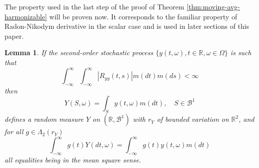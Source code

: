 \documentclass{article}
\newtheorem{lemma}{Lemma}
\begin{document}
The property used in the last step of the proof of Theorem
\ref{thm:moving-avg-harmonizable} will be proven now. It corresponds to the
familiar property of Radon-Nikodym derivative in the scalar case and is used
in later sections of this paper.

\begin{lemma}
  \label{lem:radon-nikodym}If the second-order stochastic process $\{y (t,
  \omega), t \in \mathbb{R}, \omega \in \Omega\}$ is such that
  \begin{equation}
    \int_{- \infty}^{\infty} \int_{- \infty}^{\infty} |R_{yy} (t, s) | m (dt)
    m (ds) < \infty \label{eq:Ryy-finite}
  \end{equation}
  then
  \begin{equation}
    Y (S, \omega) = \int_S y (t, \omega) m (dt), \quad S \in \mathscr{B}^1
    \label{eq:Y-lemma}
  \end{equation}
  defines a random measure $Y$ on $(\mathbb{R}, \mathscr{B}^1)$ with $r_Y$ of
  bounded variation on $\mathbb{R}^2$, and for all $g \in \Lambda_2 (r_Y)$
  \begin{equation}
    \int_{- \infty}^{\infty} g (t) Y (dt, \omega) = \int_{- \infty}^{\infty} g
    (t) y (t, \omega) m (dt) \label{eq:g-interchange}
  \end{equation}
  all equalities being in the mean square sense.
\end{lemma}
\end{document}
